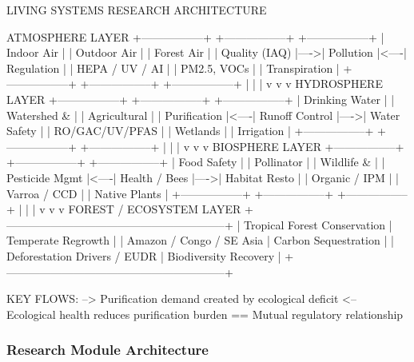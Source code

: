 \documentclass[11pt,letterpaper]{article}
\begin{document}
\begin{asciibox}
LIVING SYSTEMS RESEARCH ARCHITECTURE

  ATMOSPHERE LAYER
  +-----------------+     +-----------------+     +-----------------+
  |  Indoor Air     |     |  Outdoor Air    |     |  Forest Air     |
  |  Quality (IAQ)  |---->|  Pollution      |<----|  Regulation     |
  |  HEPA / UV / AI |     |  PM2.5, VOCs    |     |  Transpiration  |
  +-----------------+     +-----------------+     +-----------------+
           |                       |                       |
           v                       v                       v
  HYDROSPHERE LAYER
  +-----------------+     +-----------------+     +-----------------+
  |  Drinking Water |     |  Watershed &    |     |  Agricultural   |
  |  Purification   |<----|  Runoff Control |---->|  Water Safety   |
  |  RO/GAC/UV/PFAS |     |  Wetlands       |     |  Irrigation     |
  +-----------------+     +-----------------+     +-----------------+
           |                       |                       |
           v                       v                       v
  BIOSPHERE LAYER
  +-----------------+     +-----------------+     +-----------------+
  |  Food Safety    |     |  Pollinator     |     |  Wildlife &     |
  |  Pesticide Mgmt |<----|  Health / Bees  |---->|  Habitat Resto  |
  |  Organic / IPM  |     |  Varroa / CCD   |     |  Native Plants  |
  +-----------------+     +-----------------+     +-----------------+
           |                       |                       |
           v                       v                       v
  FOREST / ECOSYSTEM LAYER
  +-----------------------------------------------------------+
  |  Tropical Forest Conservation  |  Temperate Regrowth     |
  |  Amazon / Congo / SE Asia      |  Carbon Sequestration   |
  |  Deforestation Drivers / EUDR  |  Biodiversity Recovery  |
  +-----------------------------------------------------------+

  KEY FLOWS:
  --> Purification demand created by ecological deficit
  <-- Ecological health reduces purification burden
  ==  Mutual regulatory relationship
\end{asciibox}

\subsubsection{Research Module Architecture}
\end{document}
